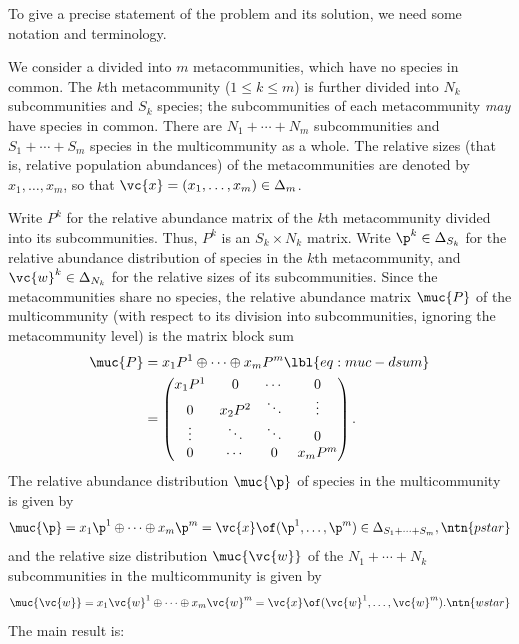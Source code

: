 To give a precise statement of the problem and its solution, we need some
notation and terminology.

We consider a  divided into $m$ metacommunities,
which have no species in common.  The $k$th metacommunity ($1 \leq k \leq
m$) is further divided into $N_k$ subcommunities and $S_k$ species; the
subcommunities of each metacommunity \emph{may} have species in common.
There are $N_1 + \cdots + N_m$ subcommunities and $S_1 + \cdots + S_m$
species in the multicommunity as a whole.  The relative sizes (that is,
relative population abundances) of the metacommunities are denoted by $x_1,
\ldots, x_m$, so that $\vc{x} = (x_1, \ldots, x_m) \in \Delta_m$.

Write $P^k$ for the relative abundance matrix of the $k$th metacommunity
divided into its subcommunities.  Thus, $P^k$ is an $S_k \times N_k$
matrix.  Write $\p^k \in \Delta_{S_k}$ for the relative abundance
distribution of species in the $k$th metacommunity, and $\vc{w}^k \in
\Delta_{N_k}$ for the relative sizes of its subcommunities.  Since the
metacommunities share no species, the relative abundance matrix
$\muc{P}$ of the multicommunity (with respect to its division
into subcommunities, ignoring the metacommunity level) is the matrix block
sum
% 
\begin{align}
\muc{P} &
=
x_1 P^1 \oplus \cdots \oplus x_m P^m
\lbl{eq:muc-dsum}
\\
&
=
\begin{pmatrix}
x_1 P^1 &0      &\cdots &0      \\
0       &x_2 P^2&\ddots &\vdots \\
\vdots  &\ddots &\ddots &0      \\
0       &\cdots &0      &x_m P^m
\end{pmatrix}.
\nonumber
\end{align}
% 
The relative abundance distribution $\muc{\p}$ of species in the
multicommunity is given by
\[
\muc{\p} 
=
x_1 \p^1 \oplus \cdots \oplus x_m \p^m
=
\vc{x} \of (\p^1, \ldots, \p^m)
\in 
\Delta_{S_1 + \cdots + S_m},
\ntn{pstar}
\]
and the relative size distribution $\muc{\vc{w}}$ of the $N_1 + \cdots
+ N_k$ subcommunities in the multicommunity is given by
\[
\muc{\vc{w}}
=
x_1 \vc{w}^1 \oplus\cdots\oplus x_m \vc{w}^m
=
\vc{x} \of (\vc{w}^1, \ldots, \vc{w}^m).
\ntn{wstar}
\]
The main result is:

